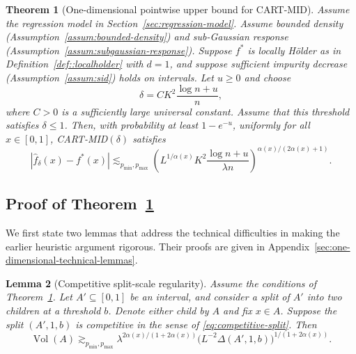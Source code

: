 \documentclass[11pt]{article}
\theoremstyle{plain}
\newtheorem{theorem}{Theorem}[section]
\newtheorem{lemma}[theorem]{Lemma}
\theoremstyle{definition}
\theoremstyle{remark}
\theoremstyle{plain}
\DeclareMathOperator{\Vol}{Vol}
\newcommand{\1}{\mathbbm{1}}
\begin{document}
\begin{theorem}[One-dimensional pointwise upper bound for CART-MID]
\label{thm:cart-mid-one-dimensional}
Assume the regression model in Section~\ref{sec:regression-model}. Assume bounded density (Assumption~\ref{assum:bounded-density}) and sub-Gaussian response (Assumption~\ref{assum:subgaussian-response}). Suppose $f^*$ is locally H\"older as in Definition~\ref{def::localholder} with $d=1$, and suppose sufficient impurity decrease (Assumption~\ref{assum:sid}) holds on intervals. 
Let $u\ge0$ and choose
\[
\delta
=
C
K^2
\frac{\log n+u}{n},
\]
where $C>0$ is a sufficiently large universal constant. Assume that this threshold satisfies $\delta\le1$.
Then, with probability at least $1-e^{-u}$, uniformly for all $x\in[0,1]$, CART-MID$(\delta)$ satisfies
\begin{equation}\label{eq:main-thm-point-eid-cart-1}
    |\hat f_\delta(x)-f^*(x)|
\lesssim_{p_{\min},p_{\max}} 
\left(
L^{1/\alpha(x)}
K^2
\frac{\log n+u}{\lambda n}
\right)^{
\alpha(x)/(2\alpha(x)+1)
}.
\end{equation}
\end{theorem}



\subsection{Proof of Theorem~\ref{thm:cart-mid-one-dimensional}}
\label{sec:one-dimensional-upper-proof-strategy}

We first state two lemmas that address the technical difficulties in making the earlier heuristic argument rigorous. 
Their proofs are given in Appendix~\ref{sec:one-dimensional-technical-lemmas}. 

\begin{lemma}[Competitive split-scale regularity]
\label{lemma:population-good-split-balance-1d}
Assume the conditions of Theorem~\ref{thm:cart-mid-one-dimensional}. Let $A'\subseteq[0,1]$ be an interval, and consider a split of $A'$ into two children at a threshold $b$. 
Denote either child by $A$ and fix $x \in A$.
Suppose the split $(A',1,b)$ is competitive in the sense of \eqref{eq:competitive-split}. Then
\[
\Vol(A)
\gtrsim_{p_{\min},p_{\max}}
\lambda^{2\alpha(x)/(1+2\alpha(x))}
\bigl(L^{-2}\Delta(A',1,b)\bigr)^{1/(1+2\alpha(x))}.
\]
\end{lemma}
\end{document}
